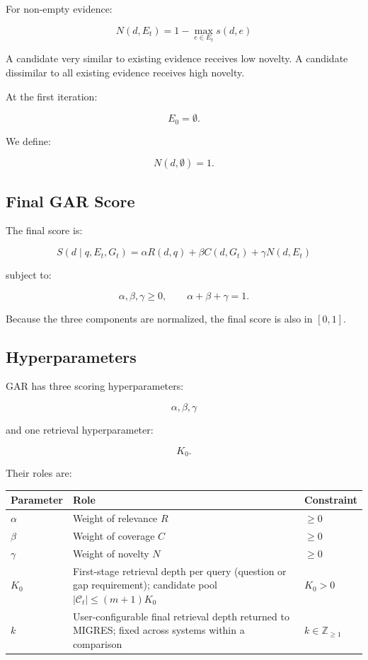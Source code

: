 \documentclass[11pt,a4paper]{article}
\begin{document}
For non-empty evidence:

\[
\boxed{
N(d,E_t)
=
1-\max_{e\in E_t}s(d,e)
}
\tag{5}
\]

A candidate very similar to existing evidence receives low novelty. A candidate dissimilar to all existing evidence receives high novelty.

At the first iteration:

\[
E_0=\emptyset.
\]

We define:

\[
\boxed{N(d,\emptyset)=1.}
\tag{6}
\]

\subsection{Final GAR Score}

The final score is:

\[
\boxed{
S(d\mid q,E_t,G_t)
=
\alpha R(d,q)
+
\beta C(d,G_t)
+
\gamma N(d,E_t)
}
\tag{7}
\]

subject to:

\[
\boxed{
\alpha,\beta,\gamma\geq0,
\qquad
\alpha+\beta+\gamma=1.
}
\tag{8}
\]

Because the three components are normalized, the final score is also in $[0,1]$.

\subsection{Hyperparameters}

GAR has three scoring hyperparameters:

\[
\boxed{
\alpha,\beta,\gamma
}
\]

and one retrieval hyperparameter:

\[
\boxed{K_0}.
\]

Their roles are:

\begin{center}
\begin{tabularx}{\textwidth}{l X l}
\toprule
\textbf{Parameter} & \textbf{Role} & \textbf{Constraint}\\
\midrule
$\alpha$ & Weight of relevance $R$ & $\geq0$\\
$\beta$ & Weight of coverage $C$ & $\geq0$\\
$\gamma$ & Weight of novelty $N$ & $\geq0$\\
$K_0$ & First-stage retrieval depth per query (question or gap requirement); candidate pool $|\mathcal{C}_t|\le(m+1)K_0$ & $K_0>0$\\
$k$ & User-configurable final retrieval depth returned to MIGRES; fixed across systems within a comparison & $k\in\mathbb{Z}_{\geq1}$\\
\bottomrule
\end{tabularx}
\end{center}
\end{document}
